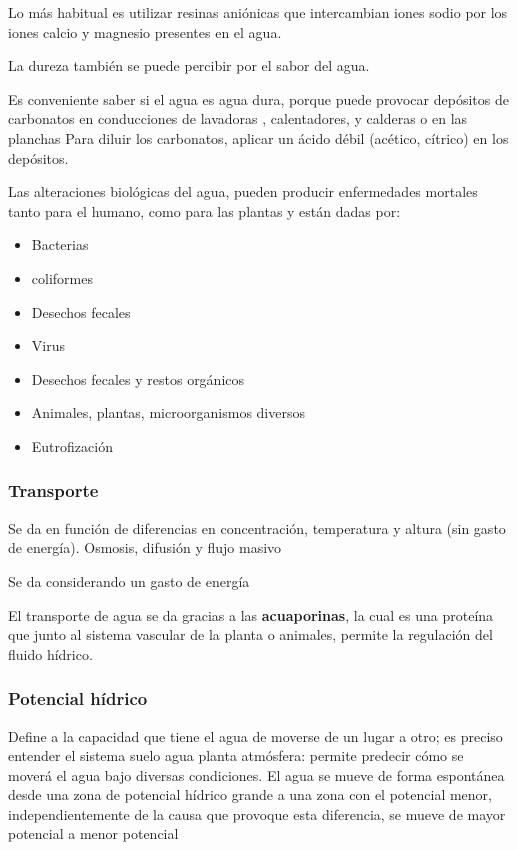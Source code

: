 Lo más habitual es utilizar resinas aniónicas que intercambian iones sodio por los iones calcio y magnesio presentes en el agua.

La dureza también se puede percibir por el sabor del agua.

Es conveniente saber si el agua es agua dura, porque puede provocar depósitos de carbonatos en conducciones de lavadoras , calentadores, y calderas o en las planchas Para diluir los carbonatos, aplicar un ácido débil (acético, cítrico) en los depósitos.

Las alteraciones biológicas del agua, pueden producir enfermedades mortales tanto para el humano, como para las plantas y están dadas por: 
\begin{itemize}
    \item Bacterias
    \item coliformes
    \item Desechos fecales
    \item Virus
    \item Desechos fecales y restos orgánicos
    \item Animales, plantas, microorganismos diversos
    \item Eutrofización
\end{itemize}


\subsubsection{Transporte}

\begin{definition}
    Se da en función de diferencias en concentración, temperatura y altura
(sin gasto de energía). Osmosis, difusión y flujo masivo
\end{definition}

\begin{definition}
    Se da considerando un gasto de energía
\end{definition}


El transporte de agua se da gracias a las \textbf{acuaporinas}, la cual es una proteína que
junto al sistema vascular de la planta o animales, permite la regulación del fluido hídrico. 

\subsubsection{Potencial hídrico}

\begin{definition}
    Define a la capacidad que tiene el agua de moverse de un lugar a otro; es preciso entender el sistema suelo agua planta atmósfera:
    permite predecir cómo se moverá el agua bajo diversas condiciones. El agua se mueve de forma espontánea desde una zona de potencial hídrico grande a una zona con el potencial menor, independientemente de la causa que provoque esta diferencia, se mueve de mayor potencial a menor potencial
\end{definition}

